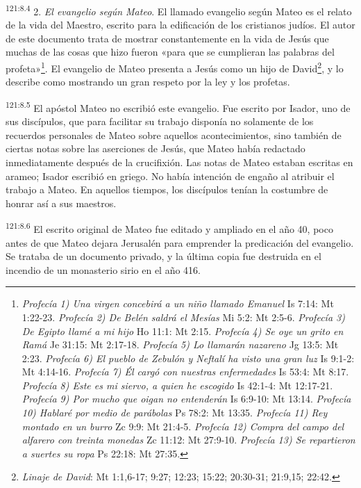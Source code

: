 \par
\textsuperscript{121:8.4} 2. \textit{El evangelio según Mateo}. El llamado evangelio según Mateo es el relato de la vida del Maestro, escrito para la edificación de los cristianos judíos. El autor de este documento trata de mostrar constantemente en la vida de Jesús que muchas de las cosas que hizo fueron «para que se cumplieran las palabras del profeta»\footnote{\textit{Profecía 1) Una virgen concebirá a un niño llamado Emanuel} Is 7:14: Mt 1:22-23. \textit{Profecía 2) De Belén saldrá el Mesías} Mi 5:2: Mt 2:5-6. \textit{Profecía 3) De Egipto llamé a mi hijo} Ho 11:1: Mt 2:15. \textit{Profecía 4) Se oye un grito en Ramá} Je 31:15: Mt 2:17-18. \textit{Profecía 5) Lo llamarán nazareno} Jg 13:5: Mt 2:23. \textit{Profecía 6) El pueblo de Zebulón y Neftalí ha visto una gran luz} Is 9:1-2: Mt 4:14-16. \textit{Profecía 7) Él cargó con nuestras enfermedades} Is 53:4: Mt 8:17. \textit{Profecía 8) Este es mi siervo, a quien he escogido} Is 42:1-4: Mt 12:17-21. \textit{Profecía 9) Por mucho que oigan no entenderán} Is 6:9-10: Mt 13:14. \textit{Profecía 10) Hablaré por medio de parábolas} Ps 78:2: Mt 13:35. \textit{Profecía 11) Rey montado en un burro} Zc 9:9: Mt 21:4-5. \textit{Profecía 12) Compra del campo del alfarero con treinta monedas} Zc 11:12: Mt 27:9-10. \textit{Profecía 13) Se repartieron a suertes su ropa} Ps 22:18: Mt 27:35.}. El evangelio de Mateo presenta a Jesús como un hijo de David\footnote{\textit{Linaje de David}: Mt 1:1,6-17; 9:27; 12:23; 15:22; 20:30-31; 21:9,15; 22:42.}, y lo describe como mostrando un gran respeto por la ley y los profetas.

\par
\textsuperscript{121:8.5} El apóstol Mateo no escribió este evangelio. Fue escrito por Isador, uno de sus discípulos, que para facilitar su trabajo disponía no solamente de los recuerdos personales de Mateo sobre aquellos acontecimientos, sino también de ciertas notas sobre las aserciones de Jesús, que Mateo había redactado inmediatamente después de la crucifixión. Las notas de Mateo estaban escritas en arameo; Isador escribió en griego. No había intención de engaño al atribuir el trabajo a Mateo. En aquellos tiempos, los discípulos tenían la costumbre de honrar así a sus maestros.

\par
\textsuperscript{121:8.6} El escrito original de Mateo fue editado y ampliado en el año 40, poco antes de que Mateo dejara Jerusalén para emprender la predicación del evangelio. Se trataba de un documento privado, y la última copia fue destruida en el incendio de un monasterio sirio en el año 416.

